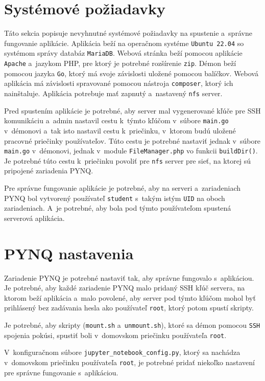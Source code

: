 \section{Systémové požiadavky}

Táto sekcia popisuje nevyhnutné systémové požiadavky na spustenie a~správne fungovanie aplikácie. Aplikácia beží na operačnom systéme \verb|Ubuntu 22.04| so systémom správy databáz \verb|MariaDB|. Webová stránka beží pomocou aplikácie \verb|Apache| a~jazykom PHP, pre ktorý je potrebné rozšírenie \verb|zip|. Démon beží pomocou jazyka \verb|Go|, ktorý má svoje závislosti uložené pomocou balíčkov. Webová aplikácia má závislosti spravované pomocou nástroja \verb|composer|, ktorý ich nainštaluje. Aplikácia potrebuje mať zapnutý a~nastavený \verb|nfs| server.

Pred spustením aplikácie je potrebné, aby server mal vygenerované kľúče pre SSH komunikáciu a~admin nastavil cestu k~týmto kľúčom v~súbore \verb|main.go| v~démonovi a~tak isto nastavil cestu k~priečinku, v~ktorom budú uložené pracovné priečinky používateľov. Túto cestu je potrebné nastaviť jednak v~súbore \verb|main.go| v~démonovi, jednak v~module \verb|FileManager.php| vo funkcii \verb|buildDir()|. Je potrebné túto cestu k~priečinku povoliť pre \verb|nfs| server pre sieť, na ktorej sú pripojené zariadenia PYNQ. 

Pre správne fungovanie aplikácie je potrebné, aby na serveri a~zariadeniach PYNQ bol vytvorený používateľ \verb|student| s~takým istým \verb|UID| na oboch zariadeniach. A~je potrebné, aby bola pod týmto používateľom spustená serverová aplikácia.   

\section{PYNQ nastavenia}

Zariadenie PYNQ je potrebné nastaviť tak, aby správne fungovalo s~aplikáciou. Je potrebné, aby každé zariadenie PYNQ malo pridaný SSH kľúč servera, na ktorom beží aplikácia a~malo povolené, aby server pod týmto kľúčom mohol byť prihlásený bez zadávania hesla ako používateľ \verb|root|, ktorý potom spustí skripty.

Je potrebné, aby skripty (\verb|mount.sh| a~\verb|unmount.sh|), ktoré sa démon pomocou \verb|SSH| spojenia pokúsi, spustiť boli v~domovskom priečinku používateľa \verb|root|.

V~konfiguračnom súbore \verb|jupyter_notebook_config.py|, ktorý sa nachádza v~domovskom priečinku používateľa \verb|root|, je potrebné pridať niekoľko nastavení pre správne fungovanie s~aplikáciou.

